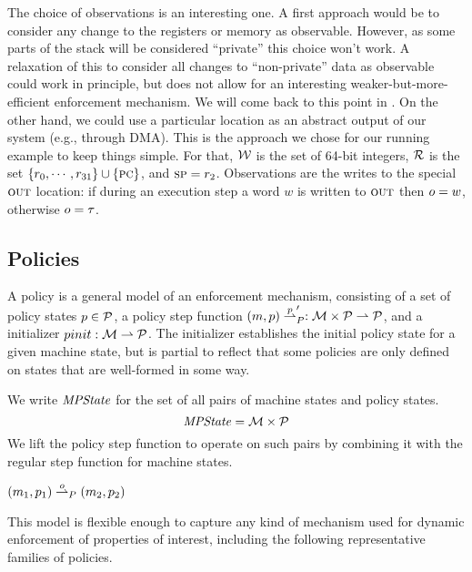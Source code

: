 \documentclass[acmsmall,review,anonymous]{acmart}\settopmatter{printfolios=true,printccs=false,printacmref=false}
\begin{document}
The choice of observations is an interesting one. A first approach
would be to consider any change to the registers or memory as observable.
However, as some parts of the stack will be considered ``private''
this choice won't work. A relaxation of this to consider all changes
to ``non-private'' data as observable could work in principle, but
does not allow for an interesting weaker-but-more-efficient enforcement
mechanism. We will come back to this point in . On the
other hand, we could use a particular location as an abstract output
of our system (e.g., through DMA). This is the approach we chose for
our running example to keep things simple. For that, ${\mathcal W}$ is the
set of 64-bit integers, ${\mathcal R}$ is the set $\{r_0, \cdots, r_{31}\}
\cup \{\textsc{pc}\}$, and $\textsc{sp} = r_2$. Observations are the writes to the
special $\textsc{out}$ location: if during an execution step a word $w$ is
written to $\textsc{out}$ then $o = w$, otherwise $o = \tau$.

\subsection{Policies}

A policy is a general model of an enforcement mechanism, consisting of a
set of policy states \(p \in \mathcal{P}\), a policy step function
\((m, p) \overset{p}{\rightharpoonup}_P' : {\mathcal M} \times \mathcal{P}
\rightharpoonup \mathcal{P}\), and a initializer \(pinit : {\mathcal M} \rightharpoonup
\mathcal{P}\). The initializer establishes the initial policy state for a given
machine state, but is partial to reflect that some policies are only defined
on states that are well-formed in some way.

We write $\mathit{MPState}$ for the set of all pairs of machine states and policy
states.
%
\[\mathit{MPState} = {\mathcal M} \times \mathcal{P}\]
%
We lift the policy step function to operate on such pairs
by combining it with the regular step function for machine states.

            {\((m_1,p_1) \overset{o}{\rightharpoonup}_P
               (m_2,p_2)\)}


This model is flexible enough to capture any kind of mechanism used for dynamic
enforcement of properties of interest, including the following representative
families of policies.
\end{document}
